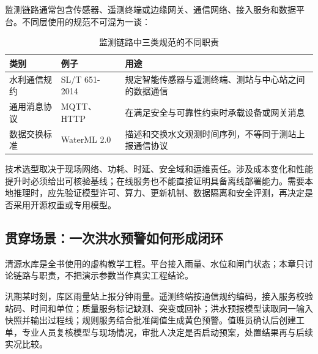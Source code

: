 监测链路通常包含传感器、遥测终端或边缘网关、通信网络、接入服务和数据平台。不同层使用的规范不可混为一谈：

\begin{table}[htbp]
\centering
\caption{监测链路中三类规范的不同职责}
\label{tab:monitoring-protocol-roles}
\begin{tabular}{p{2.4cm}p{4.5cm}p{5.7cm}}
\toprule
类别 & 例子 & 用途 \\
\midrule
水利通信规约 & SL/T 651-2014 & 规定智能传感器与遥测终端、测站与中心站之间的数据通信\cite{slt6512014} \\
通用消息协议 & MQTT、HTTP & 在满足安全与可靠性约束时承载设备或网关消息 \\
数据交换标准 & WaterML 2.0 & 描述和交换水文观测时间序列，不等同于测站上报通信协议 \\
\bottomrule
\end{tabular}
\end{table}

技术选型取决于现场网络、功耗、时延、安全域和运维责任。涉及成本变化和性能提升时必须给出可核验基线；在线服务也不能直接证明具备离线部署能力。需要本地推理时，应先验证模型许可、算力、更新机制、数据隔离和安全评测，再决定是否采用开源权重或专用模型。

\subsection{贯穿场景：一次洪水预警如何形成闭环}

清源水库是全书使用的虚构教学工程。平台接入雨量、水位和闸门状态；本章只讨论链路与职责，不把演示参数当作真实工程结论。

汛期某时刻，库区雨量站上报分钟雨量。遥测终端按通信规约编码，接入服务校验站码、时间和单位；质量服务标记缺测、突变或回补；洪水预报模型读取同一输入快照并输出过程线；规则服务结合批准阈值生成黄色预警。值班员确认后创建工单，专业人员复核模型与现场情况，审批人决定是否启动预案，处置结果再与后续实况比较。

